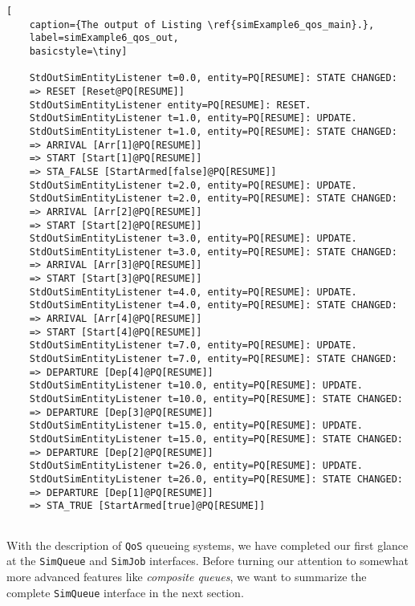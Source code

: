 \begin{lstfloat}
	\begin{lstlisting}[
	caption={The output of Listing \ref{simExample6_qos_main}.},
	label=simExample6_qos_out,
	basicstyle=\tiny]
	
	StdOutSimEntityListener t=0.0, entity=PQ[RESUME]: STATE CHANGED:
	=> RESET [Reset@PQ[RESUME]]
	StdOutSimEntityListener entity=PQ[RESUME]: RESET.
	StdOutSimEntityListener t=1.0, entity=PQ[RESUME]: UPDATE.
	StdOutSimEntityListener t=1.0, entity=PQ[RESUME]: STATE CHANGED:
	=> ARRIVAL [Arr[1]@PQ[RESUME]]
	=> START [Start[1]@PQ[RESUME]]
	=> STA_FALSE [StartArmed[false]@PQ[RESUME]]
	StdOutSimEntityListener t=2.0, entity=PQ[RESUME]: UPDATE.
	StdOutSimEntityListener t=2.0, entity=PQ[RESUME]: STATE CHANGED:
	=> ARRIVAL [Arr[2]@PQ[RESUME]]
	=> START [Start[2]@PQ[RESUME]]
	StdOutSimEntityListener t=3.0, entity=PQ[RESUME]: UPDATE.
	StdOutSimEntityListener t=3.0, entity=PQ[RESUME]: STATE CHANGED:
	=> ARRIVAL [Arr[3]@PQ[RESUME]]
	=> START [Start[3]@PQ[RESUME]]
	StdOutSimEntityListener t=4.0, entity=PQ[RESUME]: UPDATE.
	StdOutSimEntityListener t=4.0, entity=PQ[RESUME]: STATE CHANGED:
	=> ARRIVAL [Arr[4]@PQ[RESUME]]
	=> START [Start[4]@PQ[RESUME]]
	StdOutSimEntityListener t=7.0, entity=PQ[RESUME]: UPDATE.
	StdOutSimEntityListener t=7.0, entity=PQ[RESUME]: STATE CHANGED:
	=> DEPARTURE [Dep[4]@PQ[RESUME]]
	StdOutSimEntityListener t=10.0, entity=PQ[RESUME]: UPDATE.
	StdOutSimEntityListener t=10.0, entity=PQ[RESUME]: STATE CHANGED:
	=> DEPARTURE [Dep[3]@PQ[RESUME]]
	StdOutSimEntityListener t=15.0, entity=PQ[RESUME]: UPDATE.
	StdOutSimEntityListener t=15.0, entity=PQ[RESUME]: STATE CHANGED:
	=> DEPARTURE [Dep[2]@PQ[RESUME]]
	StdOutSimEntityListener t=26.0, entity=PQ[RESUME]: UPDATE.
	StdOutSimEntityListener t=26.0, entity=PQ[RESUME]: STATE CHANGED:
	=> DEPARTURE [Dep[1]@PQ[RESUME]]
	=> STA_TRUE [StartArmed[true]@PQ[RESUME]]
	
	\end{lstlisting}
\end{lstfloat}

With the description of \lstinline|QoS| queueing systems,
we have completed our first glance at the \lstinline|SimQueue|
and \lstinline|SimJob| interfaces.
Before turning our attention to somewhat more advanced features like
{\em composite queues},
we want to summarize the complete \lstinline|SimQueue| interface in the next section.
